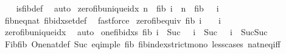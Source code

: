 \begin{isabellebody}
%
\isadelimproof
\ \ %
\endisadelimproof
%
\isatagproof
{}\isamarkupfalse%
\ is{\isacharunderscore}{\kern0pt}fib{\isacharunderscore}{\kern0pt}def\ \isamarkupfalse%
\ auto%
\endisatagproof
{\isafoldproof}%
%
\isadelimproof
\isanewline
%
\endisadelimproof
\isanewline
{}\isamarkupfalse%
\ zero{\isacharunderscore}{\kern0pt}fib{\isacharunderscore}{\kern0pt}unique{\isacharunderscore}{\kern0pt}idx{\isacharcolon}{\kern0pt}\ {\isachardoublequoteopen}n\ {\isacharequal}{\kern0pt}\ fib\ i\ {\isasymLongrightarrow}\ n\ {\isacharequal}{\kern0pt}\ fib\ {}\ {\isasymLongrightarrow}\ i\ {\isacharequal}{\kern0pt}\ {}{\isachardoublequoteclose}\isanewline
%
\isadelimproof
\ \ %
\endisadelimproof
%
\isatagproof
{}\isamarkupfalse%
\ fib{\isacharunderscore}{\kern0pt}neq{\isacharunderscore}{\kern0pt}{}{\isacharunderscore}{\kern0pt}nat\ fib{\isacharunderscore}{\kern0pt}idx{\isacharunderscore}{\kern0pt}set{\isacharunderscore}{\kern0pt}def\ \isamarkupfalse%
\ fastforce%
\endisatagproof
{\isafoldproof}%
%
\isadelimproof
\isanewline
%
\endisadelimproof
\isanewline
{}\isamarkupfalse%
\ zero{\isacharunderscore}{\kern0pt}fib{\isacharunderscore}{\kern0pt}equiv{\isacharcolon}{\kern0pt}\ {\isachardoublequoteopen}fib\ i\ {\isacharequal}{\kern0pt}\ {}\ {\isasymlongleftrightarrow}\ i\ {\isacharequal}{\kern0pt}\ {}{\isachardoublequoteclose}\isanewline
%
\isadelimproof
\ \ %
\endisadelimproof
%
\isatagproof
{}\isamarkupfalse%
\ zero{\isacharunderscore}{\kern0pt}fib{\isacharunderscore}{\kern0pt}unique{\isacharunderscore}{\kern0pt}idx\ \isamarkupfalse%
\ auto%
\endisatagproof
{\isafoldproof}%
%
\isadelimproof
\isanewline
%
\endisadelimproof
\isanewline
{}\isamarkupfalse%
\ one{\isacharunderscore}{\kern0pt}fib{\isacharunderscore}{\kern0pt}idxs{\isacharcolon}{\kern0pt}\ {\isachardoublequoteopen}fib\ i\ {\isacharequal}{\kern0pt}\ Suc\ {}\ {\isasymLongrightarrow}\ i\ {\isacharequal}{\kern0pt}\ Suc\ {}\ {\isasymor}\ i\ {\isacharequal}{\kern0pt}\ Suc{\isacharparenleft}{\kern0pt}Suc\ {}{\isacharparenright}{\kern0pt}{\isachardoublequoteclose}\isanewline
%
\isadelimproof
\ \ %
\endisadelimproof
%
\isatagproof
{}\isamarkupfalse%
\ Fib{\isachardot}{\kern0pt}fib{}\ One{\isacharunderscore}{\kern0pt}nat{\isacharunderscore}{\kern0pt}def\ Suc{\isacharunderscore}{\kern0pt}{}\ eq{\isacharunderscore}{\kern0pt}imp{\isacharunderscore}{\kern0pt}le\ fib{\isacharunderscore}{\kern0pt}{}\ fib{\isacharunderscore}{\kern0pt}index{\isacharunderscore}{\kern0pt}strict{\isacharunderscore}{\kern0pt}mono\ less{\isacharunderscore}{\kern0pt}{}{\isacharunderscore}{\kern0pt}cases\ nat{\isacharunderscore}{\kern0pt}neq{\isacharunderscore}{\kern0pt}iff\ \isamarkupfalse%

\end{isabellebody}
